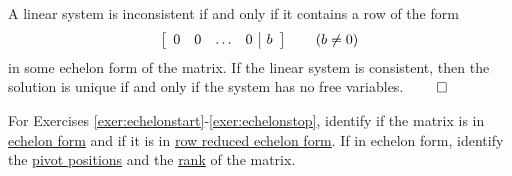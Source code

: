 \begin{Exam}
\begin{enumerate}
\begin{Thm} A linear system is inconsistent if and only if it contains a row of the form
\[\mtx{rrrr|r}{ 0 & 0 & \ldots & 0 & b}\qquad (b\neq 0)\] in some echelon form of the matrix. If the linear system is consistent, then the solution is unique if and only if the system has no free variables. \hfill$\qedhere$
\end{Thm}
\end{enumerate}
\end{Exam}\vs


\noindent For Exercises \ref{exer:echelonstart}-\ref{exer:echelonstop}, identify if the matrix is in \hyperref[def:echelon]{echelon form} and if it is in \hyperref[def:RREF]{row reduced echelon form}. If in echelon form, identify the \hyperref[def:pivot]{pivot positions} and the \hyperref[def:pivot]{rank} of the matrix.
